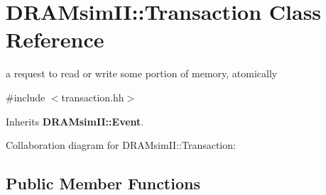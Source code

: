 \section{DRAMsimII::Transaction Class Reference}
\label{class_d_r_a_msim_i_i_1_1_transaction}


a request to read or write some portion of memory, atomically  




{\ttfamily \#include $<$transaction.hh$>$}



Inherits {\bf DRAMsimII::Event}.



Collaboration diagram for DRAMsimII::Transaction:\subsection*{Public Member Functions}
